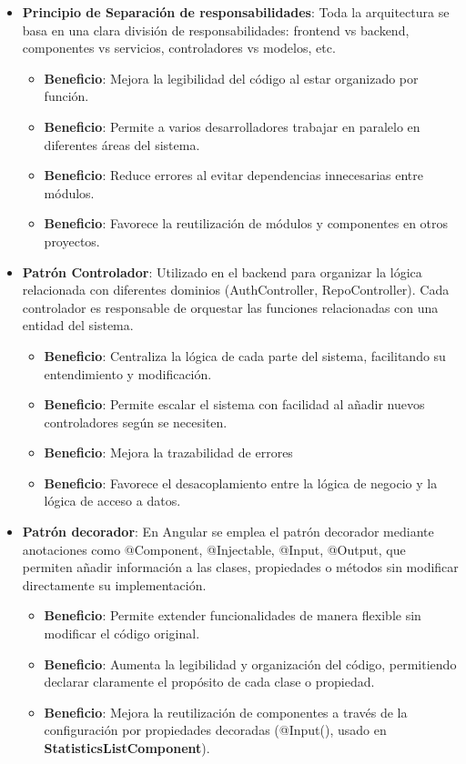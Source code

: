 \begin{itemize}
    \item \textbf{Principio de Separación de responsabilidades}: Toda la arquitectura se basa en una clara división de responsabilidades: frontend vs backend, componentes vs servicios, controladores vs modelos, etc.
    \begin{itemize}
        \item \textbf{Beneficio}: Mejora la legibilidad del código al estar organizado por función.
        \item \textbf{Beneficio}: Permite a varios desarrolladores trabajar en paralelo en diferentes áreas del sistema.
        \item \textbf{Beneficio}: Reduce errores al evitar dependencias innecesarias entre módulos.
        \item \textbf{Beneficio}: Favorece la reutilización de módulos y componentes en otros proyectos.
    \end{itemize}
    
    \item \textbf{Patrón Controlador}: Utilizado en el backend para organizar la lógica relacionada con diferentes dominios (AuthController, RepoController). Cada controlador es responsable de orquestar las funciones relacionadas con una entidad del sistema.
    \begin{itemize}
        \item \textbf{Beneficio}: Centraliza la lógica de cada parte del sistema, facilitando su entendimiento y modificación.
        \item \textbf{Beneficio}: Permite escalar el sistema con facilidad al añadir nuevos controladores según se necesiten.
        \item \textbf{Beneficio}: Mejora la trazabilidad de errores
        \item \textbf{Beneficio}: Favorece el desacoplamiento entre la lógica de negocio y la lógica de acceso a datos.
    \end{itemize}
    
    \item \textbf{Patrón decorador}: En Angular se emplea el patrón decorador mediante anotaciones como @Component, @Injectable, @Input, @Output, que permiten añadir información a las clases, propiedades o métodos sin modificar directamente su implementación.
    \begin{itemize}
        \item \textbf{Beneficio}: Permite extender funcionalidades de manera flexible sin modificar el código original.
        \item \textbf{Beneficio}: Aumenta la legibilidad y organización del código, permitiendo declarar claramente el propósito de cada clase o propiedad.
        \item \textbf{Beneficio}: Mejora la reutilización de componentes a través de la configuración por propiedades decoradas (@Input(), usado en \textbf{StatisticsListComponent}).
    \end{itemize}
\end{itemize}

